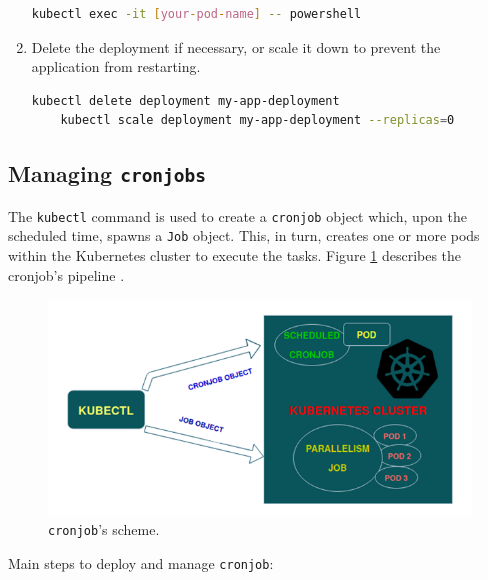 \documentclass{article}
\begin{document}
\begin{enumerate}
    \begin{lstlisting}[language=bash]
    kubectl exec -it [your-pod-name] -- powershell
    \end{lstlisting}
    
    \item Delete the deployment if necessary, or scale it down to prevent the application from restarting.
    
    \begin{lstlisting}[language=bash]
    kubectl delete deployment my-app-deployment
    kubectl scale deployment my-app-deployment --replicas=0
    \end{lstlisting}
\end{enumerate}

\subsection{Managing \texttt{cronjobs}} 

The \texttt{kubectl} command is used to create a \texttt{cronjob} object which, upon the scheduled time, spawns a \texttt{Job} object. This, in turn, creates one or more pods within the Kubernetes cluster to execute the tasks. Figure \ref{fig:cronjobscheme} describes the cronjob's pipeline \cite{cronjobs1}. 

\begin{figure}[h]
\begin{center}
\includegraphics[scale = .7]{figures/Cron-Jobs1.png}
\caption{\texttt{cronjob}'s  scheme.}
\label{fig:cronjobscheme}
\end{center}
\end{figure}

Main steps to deploy and manage \texttt{cronjob}:
\end{document}
